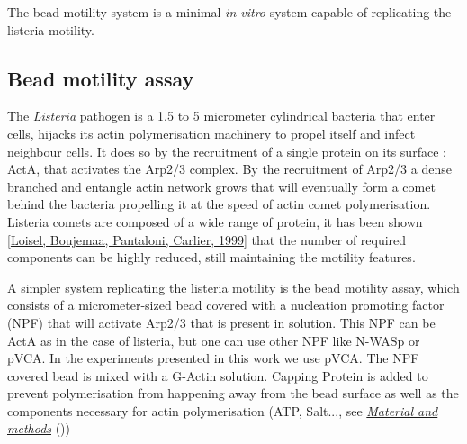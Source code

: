 \documentclass[A4paperpaper,11pt,english]{sphinxmanual}
\begin{document}
The bead motility system is a minimal \emph{in-vitro} system capable of replicating
the listeria motility.


\subsection{Bead motility assay}
\label{index-latex:bead-motility-assay}\label{index-latex:id50}
The \emph{Listeria} pathogen is a 1.5 to 5 micrometer cylindrical bacteria that
enter cells, hijacks its actin polymerisation machinery to propel itself and
infect neighbour cells. It does so by the recruitment of a single protein on its
surface : ActA, that activates the Arp2/3 complex. By the recruitment of Arp2/3 a
dense branched and entangle actin network grows that will eventually form a
comet behind the bacteria propelling it at the speed of actin comet
polymerisation. Listeria comets are composed of a wide range of protein, it has
been shown {\hyperref[index-latex:loisel1999]{{[}Loisel, Boujemaa, Pantaloni, Carlier,  1999{]}}} that the number of required components can
be highly reduced, still maintaining the motility features.

A simpler system replicating the listeria motility is the bead
motility assay, which consists of a micrometer-sized bead covered with a nucleation
promoting factor (NPF) that will activate Arp2/3 that is present in solution.  This NPF can
be ActA as in the case of listeria, but one can use other NPF like N-WASp or
pVCA. In the experiments presented in this work we use pVCA. The NPF covered
bead is mixed with a G-Actin solution. Capping Protein is added to prevent
polymerisation from happening away from the bead surface as well as the
components necessary for actin polymerisation (ATP, Salt..., see {\hyperref[index-latex:m-et-m]{\emph{Material and methods}}} ())
\end{document}
